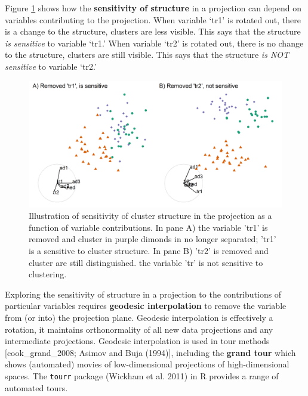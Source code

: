 \documentclass[
  11,
]{article}
\begin{document}
Figure \ref{fig:basisStructure} shows how the \textbf{sensitivity of structure} in a projection can depend on variables contributing to the projection. When variable `tr1' is rotated out, there is a change to the structure, clusters are less visible. This says that the structure \emph{is sensitive} to variable `tr1.' When variable `tr2' is rotated out, there is no change to the structure, clusters are still visible. This says that the structure \emph{is NOT sensitive} to variable `tr2.'

\begin{figure}[h]

{\centering \includegraphics[width=1\linewidth,]{./figures/basisStructure} 

}

\caption{Illustration of sensitivity of cluster structure in the projection as a function of variable contributions. In pane A) the variable 'tr1' is removed and cluster in purple dimonds in no longer separated; 'tr1' is a sensitive to cluster structure. In pane B) 'tr2' is removed and cluster are still distinguished. the variable 'tr' is not sensitive to clustering.}\label{fig:basisStructure}
\end{figure}

Exploring the sensitivity of structure in a projection to the contributions of particular variables requires \textbf{geodesic interpolation} to remove the variable from (or into) the projection plane. Geodesic interpolation is effectively a rotation, it maintains orthonormality of all new data projections and any intermediate projections. Geodesic interpolation is used in tour methods {[}cook\_grand\_2008; Asimov and Buja (1994){]}, including the \textbf{grand tour} which shows (automated) movies of low-dimensional projections of high-dimensional spaces. The \texttt{tourr} package (Wickham et al. 2011) in R provides a range of automated tours.
\end{document}
